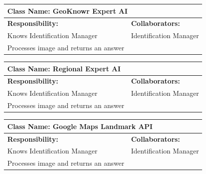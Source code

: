 \documentclass[]{article}
\begin{document}
	\begin{table}[H]
		\centering
		\begin{tabular}{|p{8cm}|p{8cm}|}
		\hline 
		 \multicolumn{2}{|l|}{\textbf{Class Name:} GeoKnowr Expert AI} \\
		\hline
		\textbf{Responsibility:} & \textbf{Collaborators:} \\
		\hline
            Knows Identification Manager & Identification Manager \\
            Processes image and returns an answer
		\vspace{1cm} & \\
		\hline
		\end{tabular}
	\end{table}

	\begin{table}[H]
		\centering
		\begin{tabular}{|p{8cm}|p{8cm}|}
		\hline 
		 \multicolumn{2}{|l|}{\textbf{Class Name:} Regional Expert AI} \\
		\hline
		\textbf{Responsibility:} & \textbf{Collaborators:} \\
		\hline
            Knows Identification Manager & Identification Manager \\
            Processes image and returns an answer
		\vspace{1cm} & \\
		\hline
		\end{tabular}
	\end{table}

	\begin{table}[H]
		\centering
		\begin{tabular}{|p{8cm}|p{8cm}|}
		\hline 
		 \multicolumn{2}{|l|}{\textbf{Class Name:} Google Maps Landmark API} \\
		\hline
		\textbf{Responsibility:} & \textbf{Collaborators:} \\
		\hline
            Knows Identification Manager & Identification Manager \\
            Processes image and returns an answer
		\vspace{1cm} & \\
		\hline
		\end{tabular}
	\end{table}
\end{document}
